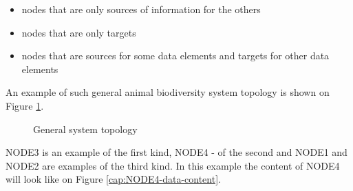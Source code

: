\begin{itemize}
\item nodes that are only sources of information for the others
\item nodes that are only targets
\item nodes that are sources for some data elements and targets for other
data elements
\end{itemize}
An example of such general animal biodiversity system topology is
shown on Figure \ref{cap:General-system-topology}.%
\begin{figure}

\caption{General system topology\label{cap:General-system-topology}}

\end{figure}
 NODE3 is an example of the first kind, NODE4 - of the second and
NODE1 and NODE2 are examples of the third kind. In this example the
content of NODE4 will look like on Figure \ref{cap:NODE4-data-content}.
%
